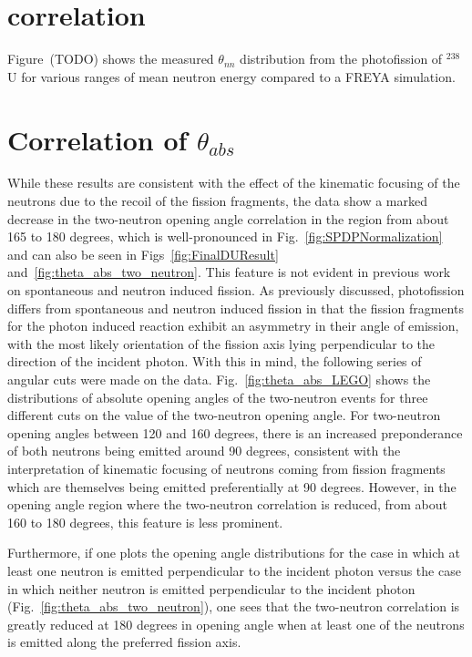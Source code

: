 \FloatBarrier
\section{correlation}
Figure~(TODO) shows the measured $\theta_{nn}$ distribution from the photofission of $^{238}$U for various ranges of mean neutron energy compared to a FREYA simulation.

\section{Correlation of $\theta_{abs}$}
While these results are consistent with the effect of the kinematic focusing of the neutrons due to the recoil of the fission fragments, the data show a marked decrease in the two-neutron opening angle correlation in the region from about 165 to 180 degrees, which is well-pronounced in Fig.~\ref{fig:SPDPNormalization} and can also be seen in Figs~\ref{fig:FinalDUResult} and~\ref{fig:theta_abs_two_neutron}.
This feature is not evident in previous work on spontaneous and neutron induced fission.
As previously discussed, photofission differs from spontaneous and neutron induced fission in that the fission fragments for the photon induced reaction exhibit an asymmetry in their angle of emission, with the most likely orientation of the fission axis lying perpendicular to the direction of the incident photon.
With this in mind, the following series of angular cuts were made on the data.
Fig.~\ref{fig:theta_abs_LEGO} shows the distributions of absolute opening angles of the two-neutron events for three different cuts on the value of the two-neutron opening angle.
For two-neutron opening angles between 120 and 160 degrees, there is an increased preponderance of both neutrons being emitted around 90 degrees, consistent with the interpretation of kinematic focusing of neutrons coming from fission fragments which are themselves being emitted preferentially at 90 degrees.
However, in the opening angle region where the two-neutron correlation is reduced, from about 160 to 180 degrees, this feature is less prominent.

Furthermore, if one plots the opening angle distributions for the case in which at least one neutron is emitted perpendicular to the incident photon versus the case in which neither neutron is emitted perpendicular to the incident photon (Fig.~\ref{fig:theta_abs_two_neutron}), one sees that the two-neutron correlation is greatly reduced at 180 degrees in opening angle when at least one of the neutrons is emitted along the preferred fission axis.

